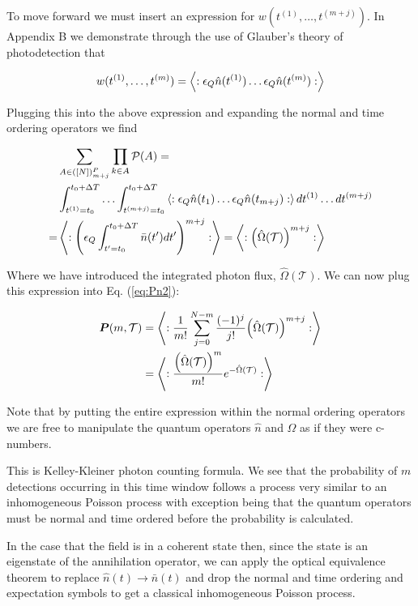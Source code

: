 \documentclass[12pt]{article}
\newcommand{\ep}{\epsilon}
\newcommand{\bv}[1]{\boldsymbol{#1}}
\begin{document}
To move forward we must insert an expression for $w(t^{(1)}, \ldots, t^{(m+j)})$. In Appendix B we demonstrate through the use of Glauber's theory of photodetection that

\begin{align}
w(t^{(1)},\ldots,t^{(m)}) = \Braket{:\ep_Q\hat{n}(t^{(1)}) \ldots \ep_Q \hat{n}(t^{(m)}) :}
\end{align}

Plugging this into the above expression and expanding the normal and time ordering operators we find

\begin{align}
&\sum_{A \in ([N])_{m+j}^P} \prod_{k \in A} \mathcal{P}(A) =\\ &\int_{t^{(1)} = t_0}^{t_0+\Delta T} \ldots \int_{t^{(m+j)} = t_0}^{t_0+\Delta T} \Braket{:\ep_Q \hat{n}(t_1) \ldots \ep_Q \hat{n}(t_{m+j}):} dt^{(1)}\ldots dt^{(m+j)}\\
= &\Braket{:\left(\ep_Q \int_{t'=t_0}^{t_0+\Delta T} \bar{n}(t') dt' \right)^{m+j}:} = \Braket{:\Big(\hat{\Omega}(\mathcal{T})\Big)^{m+j}:}
\end{align}

Where we have introduced the integrated photon flux, $\hat{\Omega}(\mathcal{T})$. We can now plug this expression into Eq. (\ref{eq:Pn2}):

\begin{align}
\bv{P}(m,\mathcal{T}) &= \Braket{:\frac{1}{m!} \sum_{j=0}^{N-m} \frac{(-1)^j}{j!} \Big(\hat{\Omega}(\mathcal{T})\Big)^{m+j}:}\\
&= \Braket{:\frac{\Big(\hat{\Omega}(\mathcal{T})\Big)^m}{m!} e^{-\hat{\Omega}(\mathcal{T})}:}
\end{align}

Note that by putting the entire expression within the normal ordering operators we are free to manipulate the quantum operators $\hat{n}$ and $\hat{\Omega}$ as if they were c-numbers. 

This is Kelley-Kleiner photon counting formula. We see that the probability of $m$ detections occurring in this time window follows a process very similar to an inhomogeneous Poisson process with exception being that the quantum operators must be normal and time ordered before the probability is calculated.

In the case that the field is in a coherent state then, since the state is an eigenstate of the annihilation operator, we can apply the optical equivalence theorem to replace $\hat{n}(t) \rightarrow \bar{n}(t)$ and drop the normal and time ordering and expectation symbols to get a classical inhomogeneous Poisson process.
\end{document}
